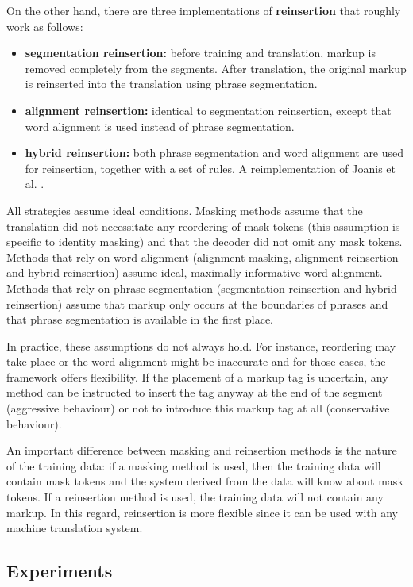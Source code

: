 \documentclass[11pt,letterpaper]{article}
\begin{document}
On the other hand, there are three implementations of \textbf{reinsertion} that roughly work as follows:

\begin{itemize}
\item \textbf{segmentation reinsertion:} before training and translation, markup is removed completely from the segments. After translation, the original markup is reinserted into the translation using phrase segmentation.
\item \textbf{alignment reinsertion:} identical to segmentation reinsertion, except that word alignment is used instead of phrase segmentation.
\item \textbf{hybrid reinsertion:} both phrase segmentation and word alignment are used for reinsertion, together with a set of rules. A reimplementation of Joanis et al. .
\end{itemize}

\noindent All strategies assume ideal conditions. Masking methods assume that the translation did not necessitate any reordering of mask tokens (this assumption is specific to identity masking) and that the decoder did not omit any mask tokens. Methods that rely on word alignment (alignment masking, alignment reinsertion and hybrid reinsertion) assume ideal, maximally informative word alignment. Methods that rely on phrase segmentation (segmentation reinsertion and hybrid reinsertion) assume that markup only occurs at the boundaries of phrases and that phrase segmentation is available in the first place.

In practice, these assumptions do not always hold. For instance, reordering may take place or the word alignment might be inaccurate and for those cases, the framework offers flexibility. If the placement of a markup tag is uncertain, any method can be instructed to insert the tag anyway at the end of the segment (aggressive behaviour) or not to introduce this markup tag at all (conservative behaviour).

An important difference between masking and reinsertion methods is the nature of the training data: if a masking method is used, then the training data will contain mask tokens and the system derived from the data will know about mask tokens. If a reinsertion method is used, the training data will not contain any markup. In this regard, reinsertion is more flexible since it can be used with any machine translation system.


\subsection{Experiments} \label{sec:exp}
\end{document}
